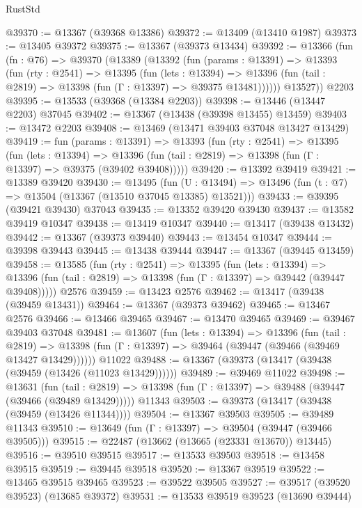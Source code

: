 \begin{lexlean}{RustStd}
\begin{coremodule}
@39370 := @13367 (@39368 @13386)
@39372 := @13409 (@13410 @1987)
@39373 := @13405 @39372
@39375 := @13367 (@39373 @13434)
@39392 := @13366
    (fun (fn : @76) =>
    @39370
      (@13389
        (@13392
          (fun (params : @13391) =>
          @13393
            (fun (rty : @2541) =>
            @13395
              (fun (lets : @13394) =>
              @13396 (fun (tail : @2819) => @13398 (fun (Γ : @13397) => @39375 @13481))))))
        @13527))
    @2203
@39395 := @13533 (@39368 (@13384 @2203))
@39398 := @13446 (@13447 @2203) @37045
@39402 := @13367 (@13438 (@39398 @13455) @13459)
@39403 := @13472 @2203
@39408 := @13469 (@13471 @39403 @37048 @13427 @13429)
@39419 := fun (params : @13391) =>
  @13393
    (fun (rty : @2541) =>
    @13395
      (fun (lets : @13394) =>
      @13396 (fun (tail : @2819) => @13398 (fun (Γ : @13397) => @39375 (@39402 @39408)))))
@39420 := @13392 @39419
@39421 := @13389 @39420
@39430 := @13495
    (fun (U : @13494) => @13496 (fun (t : @7) => @13504 (@13367 (@13510 @37045 @13385) @13521)))
@39433 := @39395 (@39421 @39430) @37043
@39435 := @13352 @39420 @39430
@39437 := @13582 @39419 @10347
@39438 := @13419 @10347
@39440 := @13417 (@39438 @13432)
@39442 := @13367 (@39373 @39440)
@39443 := @13454 @10347
@39444 := @39398 @39443
@39445 := @13438 @39444
@39447 := @13367 (@39445 @13459)
@39458 := @13585
    (fun (rty : @2541) =>
    @13395
      (fun (lets : @13394) =>
      @13396 (fun (tail : @2819) => @13398 (fun (Γ : @13397) => @39442 (@39447 @39408)))))
    @2576
@39459 := @13423 @2576
@39462 := @13417 (@39438 (@39459 @13431))
@39464 := @13367 (@39373 @39462)
@39465 := @13467 @2576
@39466 := @13466 @39465
@39467 := @13470 @39465
@39469 := @39467 @39403 @37048
@39481 := @13607
    (fun (lets : @13394) =>
    @13396
      (fun (tail : @2819) =>
      @13398 (fun (Γ : @13397) => @39464 (@39447 (@39466 (@39469 @13427 @13429))))))
    @11022
@39488 := @13367 (@39373 (@13417 (@39438 (@39459 (@13426 (@11023 @13429))))))
@39489 := @39469 @11022
@39498 := @13631
    (fun (tail : @2819) => @13398 (fun (Γ : @13397) => @39488 (@39447 (@39466 (@39489 @13429)))))
    @11343
@39503 := @39373 (@13417 (@39438 (@39459 (@13426 @11344))))
@39504 := @13367 @39503
@39505 := @39489 @11343
@39510 := @13649 (fun (Γ : @13397) => @39504 (@39447 (@39466 @39505)))
@39515 := @22487 (@13662 (@13665 (@23331 @13670)) @13445)
@39516 := @39510 @39515
@39517 := @13533 @39503
@39518 := @13458 @39515
@39519 := @39445 @39518
@39520 := @13367 @39519
@39522 := @13465 @39515 @39465
@39523 := @39522 @39505
@39527 := @39517 (@39520 @39523) (@13685 @39372)
@39531 := @13533 @39519 @39523 (@13690 @39444)

\end{coremodule}
\end{lexlean}
